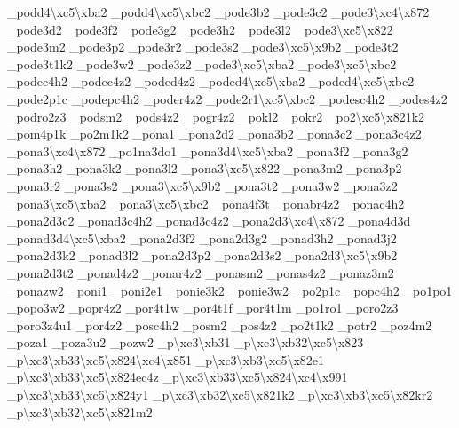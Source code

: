 {\-\_\-podd4\textbackslash{}xc5\textbackslash{}xba2 \-\_\-podd4\textbackslash{}xc5\textbackslash{}xbc2 \-\_\-pode3b2 \-\_\-pode3c2 \-\_\-pode3\textbackslash{}xc4\textbackslash{}x872 \-\_\-pode3d2 \-\_\-pode3f2 \-\_\-pode3g2 \-\_\-pode3h2 \-\_\-pode3l2 \-\_\-pode3\textbackslash{}xc5\textbackslash{}x822 \-\_\-pode3m2 \-\_\-pode3p2 \-\_\-pode3r2 \-\_\-pode3s2 \-\_\-pode3\textbackslash{}xc5\textbackslash{}x9b2 \-\_\-pode3t2 \-\_\-pode3t1k2 \-\_\-pode3w2 \-\_\-pode3z2 \-\_\-pode3\textbackslash{}xc5\textbackslash{}xba2 \-\_\-pode3\textbackslash{}xc5\textbackslash{}xbc2 \-\_\-podec4h2 \-\_\-podec4z2 \-\_\-poded4z2 \-\_\-poded4\textbackslash{}xc5\textbackslash{}xba2 \-\_\-poded4\textbackslash{}xc5\textbackslash{}xbc2 \-\_\-pode2p1c \-\_\-podepc4h2 \-\_\-poder4z2 \-\_\-pode2r1\textbackslash{}xc5\textbackslash{}xbc2 \-\_\-podesc4h2 \-\_\-podes4z2 \-\_\-podro2z3 \-\_\-podsm2 \-\_\-pods4z2 \-\_\-pogr4z2 \-\_\-pokl2 \-\_\-pokr2 \-\_\-po2\textbackslash{}xc5\textbackslash{}x821k2 \-\_\-pom4p1k \-\_\-po2m1k2 \-\_\-pona1 \-\_\-pona2d2 \-\_\-pona3b2 \-\_\-pona3c2 \-\_\-pona3c4z2 \-\_\-pona3\textbackslash{}xc4\textbackslash{}x872 \-\_\-po1na3do1 \-\_\-pona3d4\textbackslash{}xc5\textbackslash{}xba2 \-\_\-pona3f2 \-\_\-pona3g2 \-\_\-pona3h2 \-\_\-pona3k2 \-\_\-pona3l2 \-\_\-pona3\textbackslash{}xc5\textbackslash{}x822 \-\_\-pona3m2 \-\_\-pona3p2 \-\_\-pona3r2 \-\_\-pona3s2 \-\_\-pona3\textbackslash{}xc5\textbackslash{}x9b2 \-\_\-pona3t2 \-\_\-pona3w2 \-\_\-pona3z2 \-\_\-pona3\textbackslash{}xc5\textbackslash{}xba2 \-\_\-pona3\textbackslash{}xc5\textbackslash{}xbc2 \-\_\-pona4f3t \-\_\-ponabr4z2 \-\_\-ponac4h2 \-\_\-pona2d3c2 \-\_\-ponad3c4h2 \-\_\-ponad3c4z2 \-\_\-pona2d3\textbackslash{}xc4\textbackslash{}x872 \-\_\-pona4d3d \-\_\-ponad3d4\textbackslash{}xc5\textbackslash{}xba2 \-\_\-pona2d3f2 \-\_\-pona2d3g2 \-\_\-ponad3h2 \-\_\-ponad3j2 \-\_\-pona2d3k2 \-\_\-ponad3l2 \-\_\-pona2d3p2 \-\_\-pona2d3s2 \-\_\-pona2d3\textbackslash{}xc5\textbackslash{}x9b2 \-\_\-pona2d3t2 \-\_\-ponad4z2 \-\_\-ponar4z2 \-\_\-ponasm2 \-\_\-ponas4z2 \-\_\-ponaz3m2 \-\_\-ponazw2 \-\_\-poni1 \-\_\-poni2e1 \-\_\-ponie3k2 \-\_\-ponie3w2 \-\_\-po2p1c \-\_\-popc4h2 \-\_\-po1po1 \-\_\-popo3w2 \-\_\-popr4z2 \-\_\-por4t1w \-\_\-por4t1f \-\_\-por4t1m \-\_\-po1ro1 \-\_\-poro2z3 \-\_\-poro3z4u1 \-\_\-por4z2 \-\_\-posc4h2 \-\_\-posm2 \-\_\-pos4z2 \-\_\-po2t1k2 \-\_\-potr2 \-\_\-poz4m2 \-\_\-poza1 \-\_\-poza3u2 \-\_\-pozw2 \-\_\-p\textbackslash{}xc3\textbackslash{}xb31 \-\_\-p\textbackslash{}xc3\textbackslash{}xb32\textbackslash{}xc5\textbackslash{}x823 \-\_\-p\textbackslash{}xc3\textbackslash{}xb33\textbackslash{}xc5\textbackslash{}x824\textbackslash{}xc4\textbackslash{}x851 \-\_\-p\textbackslash{}xc3\textbackslash{}xb3\textbackslash{}xc5\textbackslash{}x82e1 \-\_\-p\textbackslash{}xc3\textbackslash{}xb33\textbackslash{}xc5\textbackslash{}x824ec4z \-\_\-p\textbackslash{}xc3\textbackslash{}xb33\textbackslash{}xc5\textbackslash{}x824\textbackslash{}xc4\textbackslash{}x991 \-\_\-p\textbackslash{}xc3\textbackslash{}xb33\textbackslash{}xc5\textbackslash{}x824y1 \-\_\-p\textbackslash{}xc3\textbackslash{}xb32\textbackslash{}xc5\textbackslash{}x821k2 \-\_\-p\textbackslash{}xc3\textbackslash{}xb3\textbackslash{}xc5\textbackslash{}x82kr2 \-\_\-p\textbackslash{}xc3\textbackslash{}xb32\textbackslash{}xc5\textbackslash{}x821m2 }
